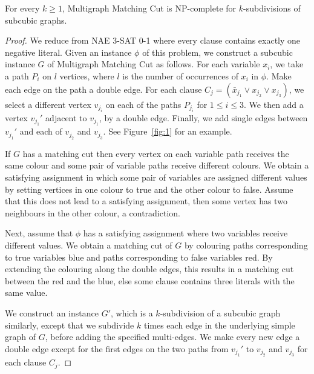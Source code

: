 \documentclass[a4paper,UKenglish,cleveref, autoref,thm-restate]{lipics-v2021}
\begin{document}
\begin{proposition}\label{lem:mmc-k-sub}
 For every $k\geq 1$,   {\sc Multigraph Matching Cut} is NP-complete for $k$-subdivisions of subcubic graphs.
\end{proposition}
\begin{proof}
We reduce from {\sc NAE 3-SAT 0-1} where every clause contains exactly one negative literal. Given an instance $\phi$ of this problem, we construct a subcubic instance $G$ of {\sc Multigraph Matching Cut} as follows. 
For each variable $x_i$, we take a path $P_i$ on $l$ vertices, where $l$ is the number of occurrences of $x_i$ in $\phi$. Make each edge on the path a double edge. For each clause $C_j= (\bar{x}_{j_1} \lor x_{j_2} \lor x_{j_3})$, we select a different vertex $v_{j_i}$ on each of the paths $P_{j_i}$ for $1 \leq i \leq 3.$ We then add a vertex $v_{j_1}'$ adjacent to $v_{j_1}$, by a double edge. Finally, we add single edges between $v_{j_1}'$ and each of $v_{j_2}$ and $v_{j_3}$. See Figure~\ref{fig:1} for an example.

If $G$ has a matching cut then every vertex on each variable path receives the same colour and some pair of variable paths receive different colours. We obtain a satisfying assignment in which some pair of variables are assigned different values by setting vertices in one colour to true and the other colour to false. Assume that this does not lead to a satisfying assignment, then some vertex has two neighbours in the other colour, a contradiction.

Next, assume that $\phi$ has a satisfying assignment where two variables receive different values. We obtain a matching cut of $G$ by colouring paths corresponding to true variables blue and paths corresponding to false variables red. By extending the colouring along the double edges, this results in a matching cut between the red and the blue, else some clause contains three literals with the same value.

We construct an instance $G'$, which is a $k$-subdivision of a subcubic graph similarly, except that we subdivide $k$ times each edge in the underlying simple graph of $G$, before adding the specified multi-edges. We make every new edge a double edge except for the first edges on the two paths from $v_{j_1}'$ to $v_{j_2}$ and $v_{j_3}$ for each clause $C_j$. %
\end{proof}
\end{document}
